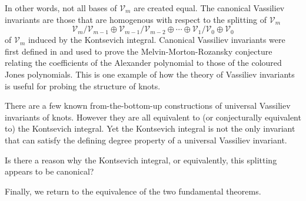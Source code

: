 In other words, not all bases of \(\mathcal{V}_{m}\) are created equal. The canonical Vassiliev invariants are those that are homogenous with respect to the splitting of \(\mathcal{V}_{m}\)
\[\mathcal{V}_{m}/\mathcal{V}_{m - 1} \oplus \mathcal{V}_{m - 1} / \mathcal{V}_{m - 2} \oplus \cdots \oplus \mathcal{V}_{1} / \mathcal{V}_{0} \oplus \mathcal{V}_{0}\]
of \(\mathcal{V}_{m}\) induced by the Kontsevich integral. Canonical Vassiliev invariants were first defined in \cite{on-the-melvin-morton-rozansky-conjecture} and used to prove the Melvin-Morton-Rozansky conjecture relating the coefficients of the Alexander polynomial to those of the coloured Jones polynomials. This is one example of how the theory of Vassiliev invariants is useful for probing the structure of knots.


\begin{remark}
	There are a few known from-the-bottom-up constructions of universal Vassiliev invariants of knots. However they are all equivalent to (or conjecturally equivalent to) the Kontsevich integral. Yet the Kontsevich integral is not the only invariant that can satisfy the defining degree property of a universal Vassiliev invariant.

	Is there a reason why the Kontsevich integral, or equivalently, this splitting appears to be canonical?
\end{remark}

Finally, we return to the equivalence of the two fundamental theorems.

